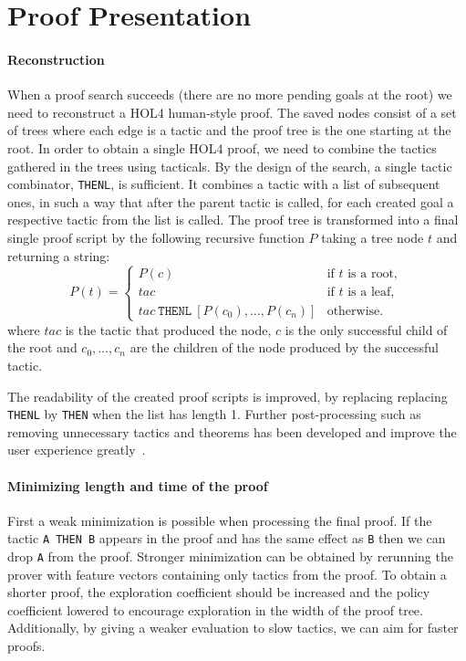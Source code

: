 \documentclass[runningheads,a4paper,draft]{svjour3}
\def\holfour{\textsf{HOL4}\xspace}
\begin{document}
\section{Proof Presentation}\label{sec:proofdisplay}

\paragraph{Reconstruction}
When a proof search succeeds (there are no more pending goals at the root)
we need to reconstruct a \holfour human-style proof.
The saved nodes consist of a set of trees where each edge is a tactic and
the proof tree is the one starting at the root.
In order to obtain a single \holfour proof, we need to combine the tactics
gathered in the trees using tacticals.
By the design of the search, a single tactic combinator, \texttt{THENL}, is 
sufficient. It combines a tactic with a list of subsequent ones, in such a way 
that after the parent tactic is called, for each created goal a respective 
tactic from the list is called.
The proof tree is transformed into a final single proof script
 by the following recursive function $P$ taking a
tree node $t$ and returning a string:
\begin{equation*}
P(t) =
\begin{cases}
P(c) & \text{if $t$ is a root},\\
tac & \text{if $t$ is a leaf},\\
tac\ \texttt{THENL}\ [P(c_0),\ldots,P(c_n)] & \text{otherwise.}
\end{cases}
\end{equation*}
where $tac$ is the tactic that produced the node, $c$ is the
only successful child of the root and $c_0, \ldots, c_n$ are the 
children of the node produced by the successful tactic.

The readability of the created proof scripts is improved, by replacing
replacing  \texttt{THENL} by \texttt{THEN} when the list has length 1.
Further post-processing such as
removing unnecessary tactics and theorems has been developed and
improve the user experience greatly~\cite{DBLP:conf/sefm/Adams15}.

\paragraph{Minimizing length and time of the proof} 
First a weak minimization is possible when processing the final proof. If the 
tactic \texttt{A THEN B} appears in the proof and has the same effect as 
\texttt{B} then we can drop \texttt{A} from the proof.
Stronger minimization can be obtained by rerunning the prover with feature 
vectors containing only tactics 
from the proof. To obtain a shorter proof, the exploration coefficient should be
increased and the policy coefficient lowered to encourage exploration in the 
width of the proof tree. Additionally, by giving a weaker evaluation to slow 
tactics, we can aim for faster proofs.
\end{document}
